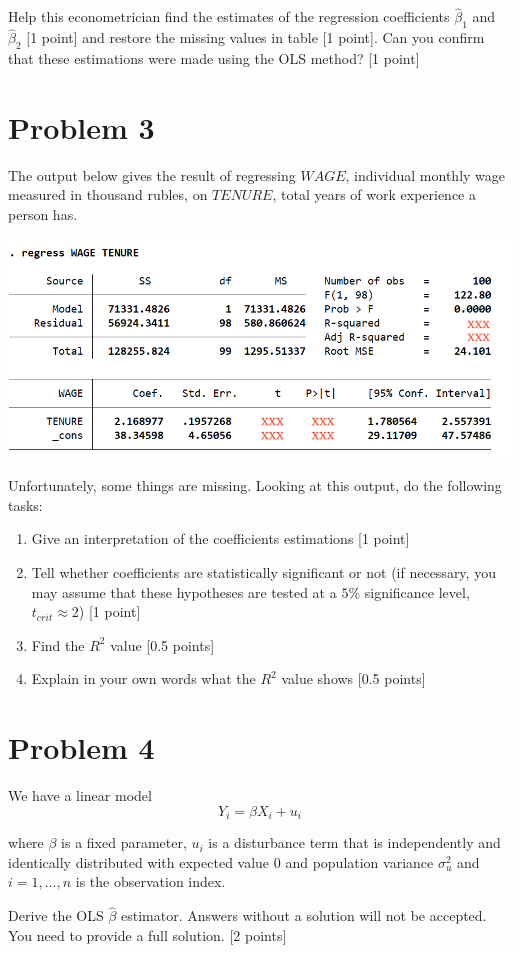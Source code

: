 \documentclass[12pt,letterpaper]{article}
\begin{document}
Help this econometrician find the estimates of the regression coefficients $\hat \beta_1$ and $\hat \beta_2$ [1 point] and restore the missing values in table [1 point]. Can you confirm that these estimations were made using the OLS method? [1 point]

\section*{Problem 3}
The output below gives the result of regressing $WAGE$, individual monthly wage measured in thousand rubles, on $TENURE$, total years of work experience a person has.

\includegraphics[scale=0.72]{Test1-model.png}

Unfortunately, some things are missing. Looking at this output, do the following tasks:

\begin{enumerate}
    \item 
    Give an interpretation of the coefficients estimations [1 point]
    
    \item
    Tell whether coefficients are statistically significant or not (if necessary, you may assume that these hypotheses are tested at a $5\%$ significance level, $t_{crit} \approx 2$) [1 point]
    
    \item
    Find the $R^2$ value [0.5 points]
    
    \item
    Explain in your own words what the $R^2$ value shows [0.5 points]
    
\end{enumerate}


\section*{Problem 4}
We have a linear model 
\begin{equation*}
    Y_i = \beta X_i + u_i
\end{equation*}

where $\beta$ is a fixed parameter, $u_i$ is a disturbance term that is independently and identically distributed with expected value 0 and population variance $\sigma_u^2$ and $i = {1, ..., n}$ is the observation index.

\setlength{\parskip}{1em} 
Derive the OLS  $\hat \beta$ estimator. Answers without a solution will not be accepted. You need to provide a full solution. [2 points]
\end{document}
